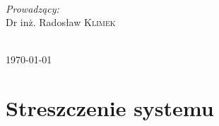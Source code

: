 \documentclass[a4paper, 11pt]{article}
\begin{document}
\begin{titlepage}
\begin{minipage}{0.4\textwidth}
\begin{flushleft}
\end{flushleft}
\end{minipage}
~
\begin{minipage}{0.4\textwidth}
\begin{flushright} \large
\emph{Prowadzący:}\\
 Dr inż. Radosław \textsc{Klimek}  %
\end{flushright}
\end{minipage} \\[5cm]

		
		
		{\large \today}\\[3cm] %
		
		
		
		
		\vfill %
		
	\end{titlepage}
	
	
	\tableofcontents
	\vfill

	\newpage
	
	\section{Streszczenie systemu}
	
\end{document}
